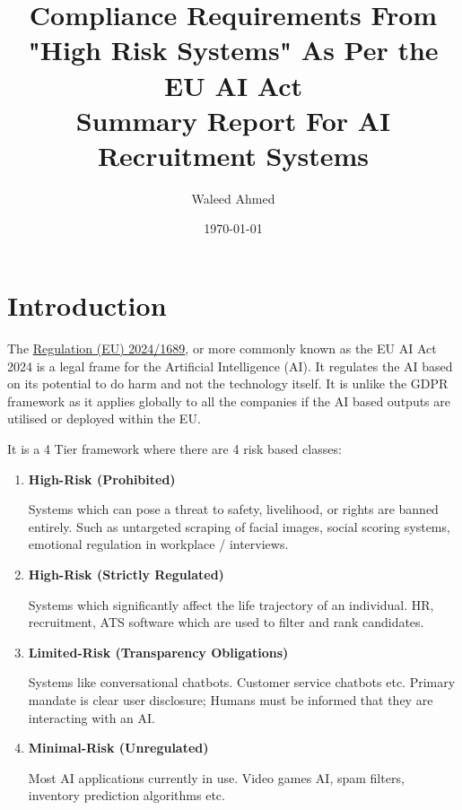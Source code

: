 \documentclass[a4paper, 12pt]{article}
\title{Compliance Requirements From "High Risk Systems" As Per the EU AI Act\\[10pt] \large 
Summary Report For AI Recruitment Systems}
\author{Waleed Ahmed}
\date{\today}
\begin{document}
\maketitle

\section{Introduction} 

The \href{https://digital-strategy.ec.europa.eu/en/policies/regulatory-framework-ai}{Regulation (EU) 2024/1689}, or more commonly known as the EU AI Act 2024 is a legal frame for the Artificial Intelligence (AI). It regulates the AI based on its potential to do harm and not the technology itself. It is unlike the GDPR framework as it applies globally to all the companies if the AI based outputs are utilised or deployed within the EU.

It is a 4 Tier framework where there are 4 risk based classes:

\begin{enumerate}[label=(\roman*)]
    \item \textbf{High-Risk (Prohibited)}
    
    Systems which can pose a threat to safety, livelihood, or rights are banned entirely.
    Such as untargeted scraping of facial images, social scoring systems, emotional regulation in workplace / interviews.

    \item \textbf{High-Risk (Strictly Regulated)}
    
    Systems which significantly affect the life trajectory of an individual.
    HR, recruitment, ATS software which are used to filter and rank candidates.

    \item \textbf{Limited-Risk (Transparency Obligations)}
    
    Systems like conversational chatbots.
    Customer service chatbots etc. Primary mandate is clear user disclosure; Humans must be informed that they are interacting with an AI.

    \item \textbf{Minimal-Risk (Unregulated)}
    
    Most AI applications currently in use.
    Video games AI, spam filters, inventory prediction algorithms etc.


\end{enumerate}

\newpage
\end{document}
